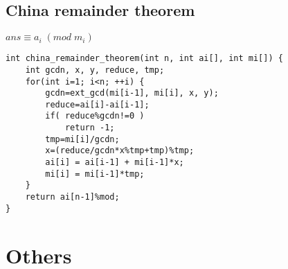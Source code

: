 \documentclass[11pt,twocolumn,a4paper]{article}
\begin{document}
\subsection{China remainder theorem}
$ ans \equiv  a_i\; (mod\; m_i) $
\begin{lstlisting}[label=China remainder theorem]
int china_remainder_theorem(int n, int ai[], int mi[]) {
	int gcdn, x, y, reduce, tmp;
	for(int i=1; i<n; ++i) {
		gcdn=ext_gcd(mi[i-1], mi[i], x, y);
		reduce=ai[i]-ai[i-1];
		if( reduce%gcdn!=0 )
			return -1;
		tmp=mi[i]/gcdn;
		x=(reduce/gcdn*x%tmp+tmp)%tmp;
		ai[i] = ai[i-1] + mi[i-1]*x;
		mi[i] = mi[i-1]*tmp;
	}
	return ai[n-1]%mod;
}
\end{lstlisting}


\newpage
\section{Others}
\end{document}
